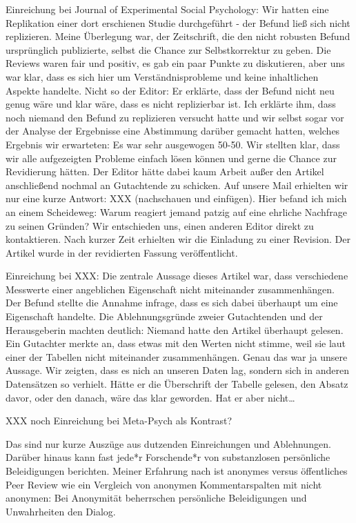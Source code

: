 \documentclass[
  letterpaper,
  DIV=11,
  numbers=noendperiod]{scrreprt}
\begin{document}
Einreichung bei Journal of Experimental Social Psychology: Wir hatten
eine Replikation einer dort erschienen Studie durchgeführt - der Befund
ließ sich nicht replizieren. Meine Überlegung war, der Zeitschrift, die
den nicht robusten Befund ursprünglich publizierte, selbst die Chance
zur Selbstkorrektur zu geben. Die Reviews waren fair und positiv, es gab
ein paar Punkte zu diskutieren, aber uns war klar, dass es sich hier um
Verständnisprobleme und keine inhaltlichen Aspekte handelte. Nicht so
der Editor: Er erklärte, dass der Befund nicht neu genug wäre und klar
wäre, dass es nicht replizierbar ist. Ich erklärte ihm, dass noch
niemand den Befund zu replizieren versucht hatte und wir selbst sogar
vor der Analyse der Ergebnisse eine Abstimmung darüber gemacht hatten,
welches Ergebnis wir erwarteten: Es war sehr ausgewogen 50-50. Wir
stellten klar, dass wir alle aufgezeigten Probleme einfach lösen können
und gerne die Chance zur Revidierung hätten. Der Editor hätte dabei kaum
Arbeit außer den Artikel anschließend nochmal an Gutachtende zu
schicken. Auf unsere Mail erhielten wir nur eine kurze Antwort: XXX
(nachschauen und einfügen). Hier befand ich mich an einem Scheideweg:
Warum reagiert jemand patzig auf eine ehrliche Nachfrage zu seinen
Gründen? Wir entschieden uns, einen anderen Editor direkt zu
kontaktieren. Nach kurzer Zeit erhielten wir die Einladung zu einer
Revision. Der Artikel wurde in der revidierten Fassung veröffentlicht.

Einreichung bei XXX: Die zentrale Aussage dieses Artikel war, dass
verschiedene Messwerte einer angeblichen Eigenschaft nicht miteinander
zusammenhängen. Der Befund stellte die Annahme infrage, dass es sich
dabei überhaupt um eine Eigenschaft handelte. Die Ablehnungsgründe
zweier Gutachtenden und der Herausgeberin machten deutlich: Niemand
hatte den Artikel überhaupt gelesen. Ein Gutachter merkte an, dass etwas
mit den Werten nicht stimme, weil sie laut einer der Tabellen nicht
miteinander zusammenhängen. Genau das war ja unsere Aussage. Wir
zeigten, dass es nich an unseren Daten lag, sondern sich in anderen
Datensätzen so verhielt. Hätte er die Überschrift der Tabelle gelesen,
den Absatz davor, oder den danach, wäre das klar geworden. Hat er aber
nicht\ldots{}

XXX noch Einreichung bei Meta-Psych als Kontrast?

Das sind nur kurze Auszüge aus dutzenden Einreichungen und Ablehnungen.
Darüber hinaus kann fast jede*r Forschende*r von substanzlosen
persönliche Beleidigungen berichten. Meiner Erfahrung nach ist anonymes
versus öffentliches Peer Review wie ein Vergleich von anonymen
Kommentarspalten mit nicht anonymen: Bei Anonymität beherrschen
persönliche Beleidigungen und Unwahrheiten den Dialog.
\end{document}
